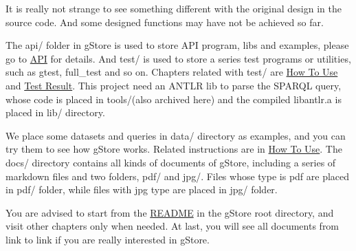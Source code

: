 \documentclass[titlepage, a4paper, 12pt]{article}
\begin{document}
It is really not strange to see something different with the original
design in the source code. And some designed functions may have not be
achieved so far.


The api/ folder in gStore is used to store API program, libs and
examples, please go to \hyperref[chapter05]{API} for details. And test/
is used to store a series test programs or utilities, such as gtest,
full\_test and so on. Chapters related with test/ are
\hyperref[chapter04]{How To Use} and \hyperref[chapter15]{Test Result}.
This project need an ANTLR lib to parse the SPARQL query, whose code is
placed in tools/(also archived here) and the compiled libantlr.a is
placed in lib/ directory.

We place some datasets and queries in data/ directory as examples, and
you can try them to see how gStore works. Related instructions are in
\hyperref[chapter04]{How To Use}. The docs/ directory contains all kinds
of documents of gStore, including a series of markdown files and two
folders, pdf/ and jpg/. Files whose type is pdf are placed in pdf/
folder, while files with jpg type are placed in jpg/ folder.

You are advised to start from the \hyperref[chapter00]{README} in the
gStore root directory, and visit other chapters only when needed. At
last, you will see all documents from link to link if you are really
interested in gStore.

\clearpage


\end{document}
